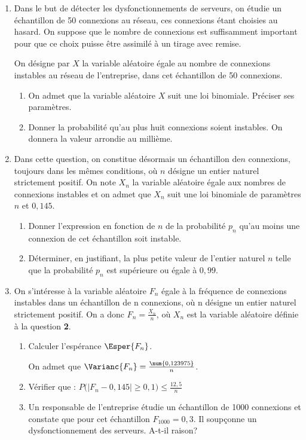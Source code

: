 \begin{enumerate}
	\item Dans le but de détecter les dysfonctionnements de serveurs, on étudie un échantillon de 50 connexions au réseau, ces connexions étant choisies au hasard. On suppose que le nombre de connexions est suffisamment important pour que ce choix puisse être assimilé à un tirage avec remise.
	
	\smallskip
	
	On désigne par $X$ la variable aléatoire égale au nombre de connexions instables au réseau de l'entreprise, dans cet échantillon de 50 connexions.
	\begin{enumerate}
		\item On admet que la variable aléatoire $X$ suit une loi binomiale. Préciser ses paramètres.
		\item Donner la probabilité qu'au plus huit connexions soient instables. On donnera la valeur arrondie au millième.
	\end{enumerate}
	\item Dans cette question, on constitue désormais un échantillon de$n$ connexions, toujours dans les mêmes conditions, où $n$ désigne un entier naturel strictement positif. On note $X_{n}$ la variable aléatoire égale aux nombres de connexions instables et on admet que $X_{n}$ suit une loi binomiale de paramètres $n$ et $0,145$.
	\begin{enumerate}
		\item Donner l'expression en fonction de $n$ de la probabilité $p_{n}$ qu'au moins une connexion de cet échantillon soit instable.
		\item Déterminer, en justifiant, la plus petite valeur de l'entier naturel $n$ telle que la probabilité $p_{n}$ est supérieure ou égale à $0,99$.
	\end{enumerate}
	\item On s'intéresse à la variable aléatoire $F_{n}$ égale à la fréquence de connexions instables dans un échantillon de n connexions, où n désigne un entier naturel strictement positif. On a donc $F_{n}=\frac{X_{n}}{n}$, où $X_{n}$ est la variable aléatoire définie à la question \textbf{2}.
	\begin{enumerate}
		\item Calculer l'espérance $\Esper{F_{n}}$.
		
		On admet que $\Varianc{F_{n}}=\frac{\num{0,123975}}{n}$.
		\item Vérifier que : $P\big(|F_{n}-0,145| \geqslant 0,1\big) \leqslant \frac{12,5}{n}$
		\item Un responsable de l'entreprise étudie un échantillon de \num{1000} connexions et constate que pour cet échantillon $F_{1000}=0,3$. Il soupçonne un dysfonctionnement des serveurs. A-t-il raison?
	\end{enumerate}
\end{enumerate}